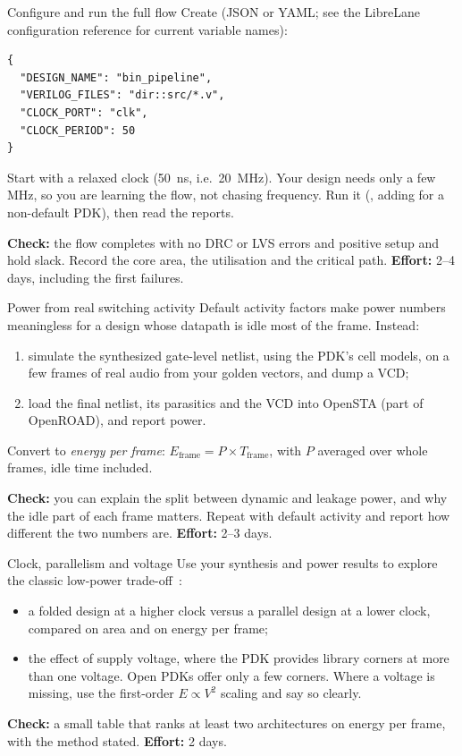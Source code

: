 \begin{stepbox}[label=st:asic:config]{Configure and run the full flow}
Create  (JSON or YAML; see the LibreLane
configuration reference for current variable names):
\begin{lstlisting}[style=plain]
{
  "DESIGN_NAME": "bin_pipeline",
  "VERILOG_FILES": "dir::src/*.v",
  "CLOCK_PORT": "clk",
  "CLOCK_PERIOD": 50
}
\end{lstlisting}
Start with a relaxed clock (\qty{50}{\ns}, i.e.\ \qty{20}{\MHz}). Your design
needs only a few MHz, so you are learning the flow, not chasing frequency. Run
it (, adding  for a non-default PDK),
then read the reports.

\textbf{Check:} the flow completes with no DRC or LVS errors and positive setup
and hold slack. Record the core area, the utilisation and the critical path.
\textbf{Effort:} 2--4 days, including the first failures.
\end{stepbox}

\begin{stepbox}[label=st:asic:power]{Power from real switching activity}
Default activity factors make power numbers meaningless for a design whose
datapath is idle most of the frame. Instead:
\begin{enumerate}
  \item simulate the synthesized gate-level netlist, using the PDK's cell
        models, on a few frames of real audio from your golden vectors, and
        dump a VCD;
  \item load the final netlist, its parasitics and the VCD into OpenSTA (part of
        OpenROAD), and report power.
\end{enumerate}
Convert to \emph{energy per frame}:
$E_\text{frame}=P\times T_\text{frame}$, with $P$ averaged over whole frames,
idle time included.

\textbf{Check:} you can explain the split between dynamic and leakage power,
and why the idle part of each frame matters. Repeat with default activity and
report how different the two numbers are. \textbf{Effort:} 2--3 days.
\end{stepbox}

\begin{stepbox}[label=st:asic:dse]{Clock, parallelism and voltage}
Use your synthesis and power results to explore the classic low-power
trade-off~\cite{chandrakasan1992lowpower}:
\begin{itemize}
  \item a folded design at a higher clock versus a parallel design at a lower
        clock, compared on area and on energy per frame;
  \item the effect of supply voltage, where the PDK provides library corners at
        more than one voltage. Open PDKs offer only a few corners. Where a
        voltage is missing, use the first-order $E\propto V^2$ scaling and say
        so clearly.
\end{itemize}

\textbf{Check:} a small table that ranks at least two architectures on energy
per frame, with the method stated. \textbf{Effort:} 2 days.
\end{stepbox}

